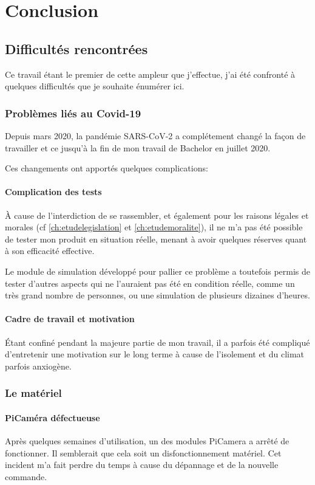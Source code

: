 \chapter{Conclusion}
\label{ch:conclusion}

\section{Difficultés rencontrées}
Ce travail étant le premier de cette ampleur que j'effectue, j'ai été
confronté à quelques difficultés que je souhaite énumérer ici.

\subsection{Problèmes liés au Covid-19}
Depuis mars 2020, la pandémie SARS-CoV-2 a complétement changé la façon
de travailler et ce jusqu'à la fin de mon travail de Bachelor en juillet 2020.

Ces changements ont apportés quelques complications:

\subsubsection{Complication des tests}
À cause de l'interdiction de se rassembler, et également pour les raisons légales et morales (cf \ref{ch:etudelegislation} et \ref{ch:etudemoralite}),
il ne m'a pas été possible de tester mon produit en situation réelle, menant à avoir quelques réserves quant à son efficacité effective.

Le module de simulation développé pour pallier ce problème a toutefois permis de tester d'autres aspects qui ne l'auraient pas été en condition réelle, comme un très grand nombre
de personnes, ou une simulation de plusieurs dizaines d'heures. 

\subsubsection{Cadre de travail et motivation}
Étant confiné pendant la majeure partie de mon travail, il a parfois été compliqué
d'entretenir une motivation sur le long terme à cause de l'isolement et du climat parfois anxiogène.

\subsection{Le matériel}

\subsubsection{PiCaméra défectueuse}
Après quelques semaines d'utilisation, un des modules PiCamera a arrêté de fonctionner.
Il semblerait que cela soit un disfonctionnement matériel. Cet incident m'a fait perdre du temps à cause du dépannage et de la nouvelle commande.

